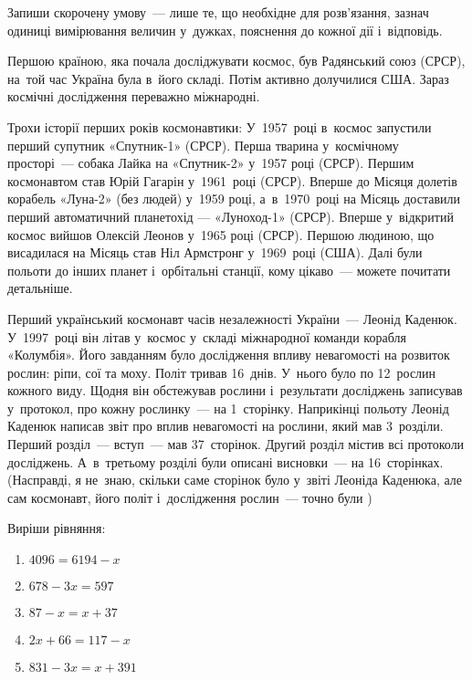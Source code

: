 \problem
Запиши скорочену умову~--- лише те, що необхідне для розв’язання,
зазнач одиниці вимірювання величин у~дужках, пояснення до кожної дії
і~відповідь.

Першою країною, яка почала досліджувати космос, був Радянський союз (СРСР),
на~той час Україна була в~його складі. Потім активно долучилися США.
Зараз космічні дослідження переважно міжнародні.

Трохи історії перших років космонавтики:
У~1957~році в~космос запустили перший супутник «Спутник-1» (СРСР).
Перша тварина у~космічному просторі~--- собака Лайка на «Спутник-2»
у~1957 році (СРСР).
Першим космонавтом став Юрій Гагарін у~1961~році (СРСР).
Вперше до Місяця долетів корабель «Луна-2» (без людей) у~1959 році,
а~в~1970~році на Місяць доставили перший автоматичний планетохід —
«Луноход-1» (СРСР).
Вперше у~відкритий космос вийшов Олексій Леонов у~1965 році (СРСР).
Першою людиною, що висадилася на Місяць став Ніл Армстронг у~1969~році (США).
Далі були польоти до інших планет і~орбітальні станції,
кому цікаво~--- можете почитати детальніше.

Перший український космонавт часів незалежності України~--- Леонід Каденюк.
У~1997~році він літав у~космос у~складі міжнародної команди корабля «Колумбія».
Його завданням було дослідження впливу невагомості на розвиток рослин:
ріпи, сої та моху. Політ тривав 16~днів. У~нього було по 12~рослин кожного виду.
Щодня він обстежував рослини і~результати досліджень записував у~протокол,
про кожну рослинку~--- на 1~сторінку. Наприкінці польоту Леонід Каденюк
написав звіт про вплив невагомості на рослини, який мав 3~розділи.
Перший розділ~--- вступ~--- мав 37~сторінок. Другий розділ містив всі
протоколи досліджень. А~в~третьому розділі були описані висновки~---
на 16~сторінках.
(Насправді, я не~знаю, скільки саме сторінок було у~звіті Леоніда Каденюка,
але сам космонавт, його політ і~дослідження рослин~--- точно були \smiley)


\problem
Виріши рівняння:
\begin{multicols}{2}
    \begin{enumerate}
        \item $4096 = 6194 - x$
        \item $678 - 3x = 597$
        \item $87 - x = x + 37$
        \item $2x + 66 = 117 - x$
        \item $831 - 3x = x + 391$
    \end{enumerate}
\end{multicols}


